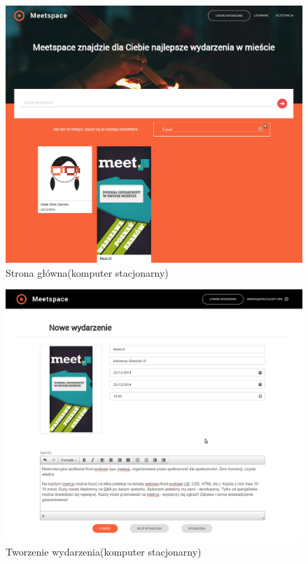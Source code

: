     \begin{figure}[h]
      \centering
      \includegraphics[scale=0.35]{images/home_pc.png}
      \caption{Strona główna(komputer stacjonarny)}
    \end{figure}

    \begin{figure}[h]
      \centering
      \includegraphics[scale=0.4]{images/event_edit_pc.png}
      \caption{Tworzenie wydarzenia(komputer stacjonarny)}
    \end{figure}

